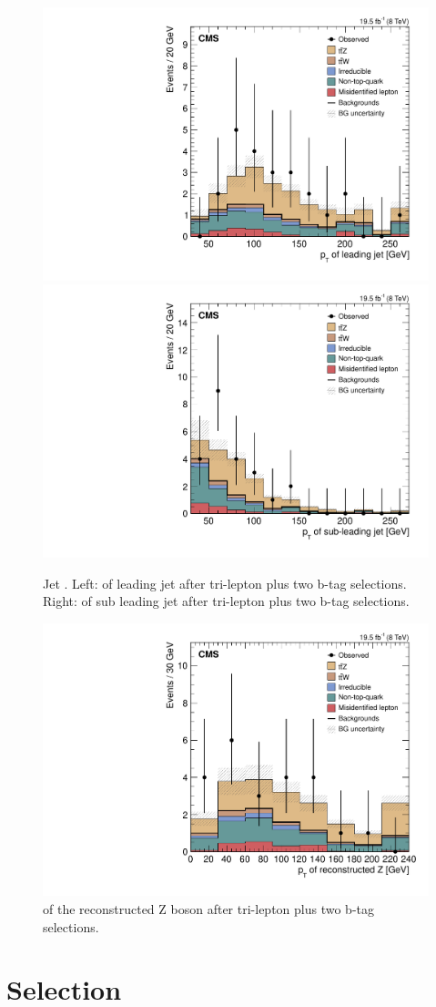 \begin{figure}[h]
\begin{center}
\includegraphics[width=0.48\linewidth]{Figs/Plots_PreSelections/hJ1Pt_3L2b.pdf}
\includegraphics[width=0.48\linewidth]{Figs/Plots_PreSelections/hJ2Pt_3L2b.pdf}
\caption{\label{fig:JPt_3L2b}
Jet \pt . Left: \pt of leading jet after tri-lepton plus two b-tag selections. Right: \pt of sub leading jet after tri-lepton plus two b-tag selections.
}
\end{center}
\end{figure}


\begin{figure}[h]
\begin{center}
\includegraphics[width=0.48\linewidth]{Figs/Plots_PreSelections/hZPt_3L2b.pdf}
\caption{\label{fig:hzpt_3L2b}
\pt of the reconstructed Z boson after tri-lepton plus two b-tag selections.
}
\end{center}
\end{figure}

\clearpage

\section{\ttZ Selection}
